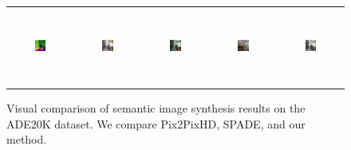 \begin{figure}[]
\begin{tabular} {cc|cc|c}
\includegraphics[width=0.1932\textwidth,height=0.96in]{Images/Rec/ADE/label/ADE_val_00000969.png} & \includegraphics[width=0.1932\textwidth,height=0.96in]{Images/Rec/ADE/gt/ADE_val_00000969.jpg} &
\includegraphics[width=0.1932\textwidth,height=0.96in]{Images/Rec/ADE/pix2pixhd/ADE_val_00000969.jpg} &   \includegraphics[width=0.1932\textwidth,height=0.96in]{Images/Rec/ADE/spade/ADE_val_00000969.jpg} &  \includegraphics[width=0.1932\textwidth,height=0.96in]{Images/Rec/ADE/ours/ADE_val_00000969.png} \\


\end{tabular}
\vspace{-2mm}
	\caption{Visual  comparison  of  semantic  image  synthesis  results  on  the ADE20K dataset. We compare Pix2PixHD, SPADE, and our method.}
	\label{fig:ADE20K results}	
\vspace{-3mm}	
 \end{figure}
 \egroup
 \addtolength{\tabcolsep}{4.5pt}